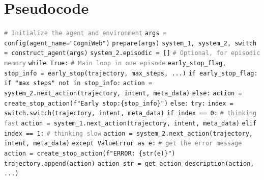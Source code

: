 \documentclass{article}
\newcommand{\pycomment}[1]{\textcolor{gray}{\texttt{\# #1}}}
\begin{document}

 


\newpage
\appendix
\section{Pseudocode}  
\begin{algorithm}
    \caption{CogniWeb}
    \label{alg:cogniweb}
    \begin{algorithmic}[1]  %
    
    \State \pycomment{Initialize the agent and environment}
    \State \texttt{args = config(agent\_name="CogniWeb")} 
    \State \texttt{prepare(args)}
    \State \texttt{system\_1, system\_2, switch = construct\_agent(args)}
    \State \texttt{system\_2.episodic = []} \pycomment{Optional, for episodic memory}
    \State
    \State \texttt{while True:} \pycomment{Main loop in one episode}
    \State \hspace{1em}\texttt{early\_stop\_flag, stop\_info = early\_stop(trajectory, max\_steps, ...)}
    \State \hspace{1em}\texttt{if early\_stop\_flag:}
    \State \hspace{2em}\texttt{if "max steps" not in stop\_info:}
    \State \hspace{3em}\texttt{action = system\_2.next\_action(trajectory, intent, meta\_data)}
    \State \hspace{2em}\texttt{else:}
    \State \hspace{3em}\texttt{action = create\_stop\_action(f"Early stop:\{stop\_info\}")}
    \State \hspace{1em}\texttt{else:}
    \State \hspace{2em}\texttt{try:}
    \State \hspace{3em}\texttt{index = switch.switch(trajectory, intent, meta\_data)}
    \State \hspace{3em}\texttt{if index == 0:} \pycomment{thinking fast}
    \State \hspace{4em}\texttt{action = system\_1.next\_action(trajectory, intent, meta\_data)}
    \State \hspace{3em}\texttt{elif index == 1:} \pycomment{thinking slow}
    \State \hspace{4em}\texttt{action = system\_2.next\_action(trajectory, intent, meta\_data)}
    \State \hspace{2em}\texttt{except ValueError as e:} \pycomment{get the error message}
    \State \hspace{3em}\texttt{action = create\_stop\_action(f"ERROR: \{str(e)\}")}
    \State
    \State \hspace{1em}\texttt{trajectory.append(action)}
    \State \hspace{1em}\texttt{action\_str = get\_action\_description(action, ...)}
    

\end{algorithmic}
\end{algorithm}
\end{document}
